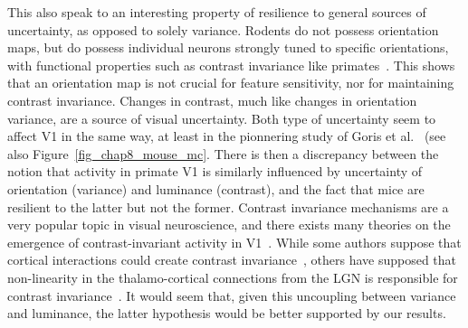 This also speak to an interesting property of resilience to general sources of uncertainty, as opposed to solely variance. Rodents do not possess orientation maps, but do possess individual neurons strongly tuned to specific orientations, with functional properties such as contrast invariance like primates~\cite{finn2007emergence}. This shows that an orientation map is not crucial for feature sensitivity, nor for maintaining contrast invariance. Changes in contrast, much like changes in orientation variance, are a source of visual uncertainty. Both type of uncertainty seem to affect \gls{V1} in the same way, at least in the pionnering study of Goris et al.~\cite{goris2015origin} (see also Figure~\ref{fig_chap8_mouse_mc}.
There is then a discrepancy between the notion that activity in primate \gls{V1} is similarly influenced by uncertainty of orientation (variance) and luminance (contrast), and the fact that mice are resilient to the latter but not the former. Contrast invariance mechanisms are a very popular topic in visual neuroscience, and there exists many theories on the emergence of contrast-invariant activity in \gls{V1}~\cite{vidyasagar2015origins}. While some authors suppose that cortical interactions could create contrast invariance~\cite{troyer1998contrast}, others have supposed that non-linearity in the thalamo-cortical connections from the \gls{LGN} is responsible for contrast invariance~\cite{finn2007emergence}. It would seem that, given this uncoupling between variance and luminance, the latter hypothesis would be better supported by our results.

